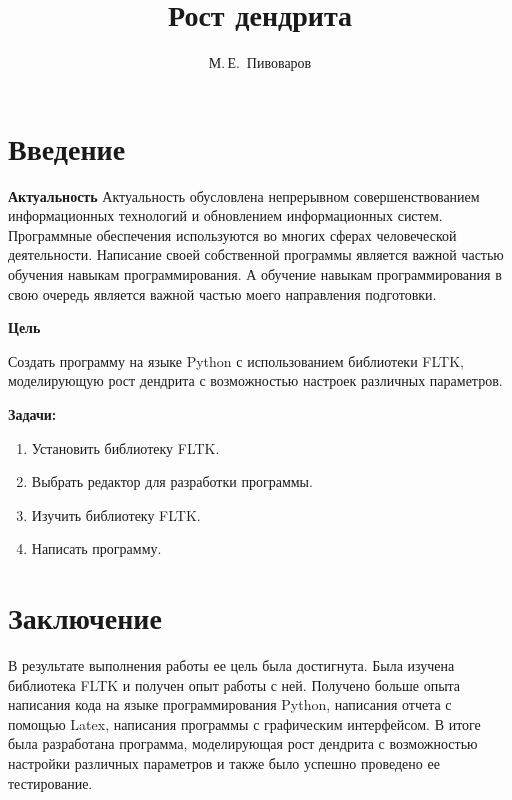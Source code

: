 \documentclass[14pt, oneside]{altsu-report}
\title{Рост дендрита}
\author{М.\,Е.~Пивоваров}
\institute{Институт цифровых технологий, электроники и физики}
\date{\the\year}
\begin{document}
\maketitle

\setcounter{page}{2}
\makeabstract
\tableofcontents

\chapter*{Введение}

\textbf{Актуальность}
Актуальность обусловлена непрерывном совершенствованием информационных технологий и обновлением информационных систем. Программные обеспечения используются во многих сферах человеческой деятельности.
Написание своей собственной программы является важной частью обучения навыкам программирования. А обучение навыкам программирования в свою очередь является важной частью моего направления подготовки. 

\textbf{Цель}

Создать программу на языке Python с использованием библиотеки FLTK, моделирующую рост дендрита с возможностью настроек различных параметров.

\textbf{Задачи:}
\begin{enumerate}
\item Установить библиотеку FLTK.
\item Выбрать редактор для разработки программы.
\item Изучить библиотеку FLTK.
\item Написать программу.
\end{enumerate}



% 

\chapter*{Заключение}

В результате выполнения работы ее цель была достигнута. Была изучена библиотека FLTK и получен опыт работы с ней. Получено больше опыта написания кода на языке программирования Python, написания отчета с помощью Latex, написания программы с графическим интерфейсом. В итоге была разработана программа, моделирующая рост дендрита с возможностью настройки различных параметров и также было успешно проведено ее тестирование.
\end{document}
